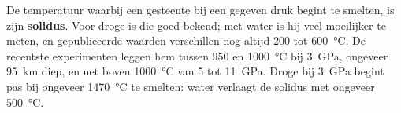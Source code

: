 De temperatuur waarbij een gesteente bij een gegeven druk begint te smelten, is zijn
\textbf{solidus}. Voor droge  is die goed bekend; met water is hij
veel moeilijker te meten, en gepubliceerde waarden verschillen nog altijd 200 tot
\qty{600}{\celsius}. De recentste experimenten leggen hem tussen 950 en
\qty{1000}{\celsius} bij \qty{3}{GPa}, ongeveer \qty{95}{km} diep, en net boven
\qty{1000}{\celsius} van 5 tot \qty{11}{GPa}. Droge  bij \qty{3}{GPa}
begint pas bij ongeveer \qty{1470}{\celsius} te smelten: water verlaagt de solidus
met ongeveer \qty{500}{\celsius}.

